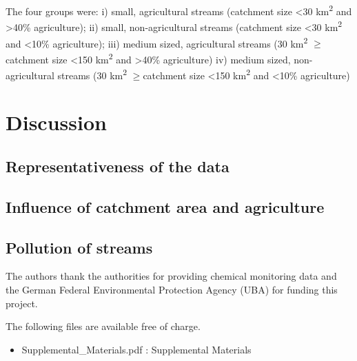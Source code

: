 \documentclass[journal=esthag,manuscript=article]{achemso}
\begin{document}
The four groups were:
i) small, agricultural streams (catchment size \textless 30 km\textsuperscript{2} and \textgreater 40\% agriculture);
ii) small, non-agricultural streams (catchment size \textless 30 km\textsuperscript{2} and \textless 10\% agriculture);
iii) medium sized, agricultural streams (30 km\textsuperscript{2} $\ge$catchment size \textless 150 km\textsuperscript{2} and \textgreater 40\% agriculture)
iv) medium sized, non-agricultural streams (30 km\textsuperscript{2} $\ge$catchment size \textless 150 km\textsuperscript{2} and \textless 10\% agriculture)



\section{Discussion}






\subsection{Representativeness of the data}

\subsection{Influence of catchment area and agriculture}

\subsection{Pollution of streams}



\begin{acknowledgement}
The authors thank the authorities for providing chemical monitoring data and the German Federal Environmental Protection Agency (UBA) for funding this project.
\end{acknowledgement}


\begin{suppinfo}
The following files are available free of charge.
\begin{itemize}
  \item Supplemental\_Materials.pdf : Supplemental Materials
\end{itemize}
\end{suppinfo}




\end{document}
